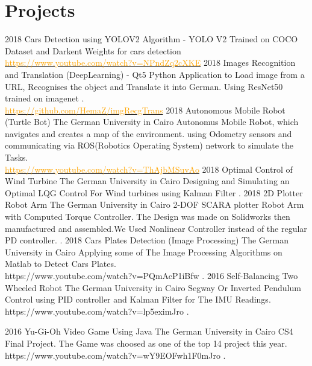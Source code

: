 \documentclass[]{friggeri-cv}
\begin{document}
\section{Projects}
\begin{entrylist}
 \entry
    {2018}
    {Cars Detection using YOLOV2 Algorithm}
    {-}
    {YOLO V2 Trained on COCO Dataset and Darkent Weights for cars detection\\
    {\href{https://www.youtube.com/watch?v=NPndZq2cXKE}{\textcolor{orange}{https://www.youtube.com/watch?v=NPndZq2cXKE}} }}
  \entry
    {2018}
    {Images Recognition and Translation (DeepLearning)}
    {-}
    {Qt5 Python Application to Load image from a URL, Recognises the object and Translate it into German.
    Using ResNet50 trained on imagenet . \\
    {\href{https://github.com/HemaZ/imgRecgTrans}{\textcolor{orange}{https://github.com/HemaZ/imgRecgTrans}} }}
  \entry
    {2018}
    {Autonomous Mobile Robot (Turtle Bot)}
    {The German University in Cairo}
    {Autonomus Mobile Robot, which navigates and creates a map of the environment. using Odometry sensors and communicating via ROS(Robotics Operating System) network to simulate the Tasks. \\
    {\href{https://www.youtube.com/watch?v=ThAjbMSuvAo}{\textcolor{orange}{https://www.youtube.com/watch?v=ThAjbMSuvAo}} }}
     \entry
    {2018}
    {Optimal Control of Wind Turbine}
    {The German University in Cairo}
    {Designing and Simulating an Optimal LQG Control For Wind turbines using Kalman Filter  .
    }
    \entry
    {2018}
    {2D Plotter Robot Arm}
    {The German University in Cairo}
    {2-DOF SCARA plotter Robot Arm with Computed Torque Controller. The Design was made on Solidworks then manufactured and assembled.We Used Nonlinear Controller instead of the regular PD controller.  .
    }
           \entry
    {2018}
    {Cars Plates Detection (Image Processing)}
    {The German University in Cairo}
    {Applying some of The Image Processing Algorithms on Matlab to Detect Cars Plates.\\
    https://www.youtube.com/watch?v=PQmAcP1iBfw  .
    }
           \entry
    {2016}
    {Self-Balancing Two Wheeled Robot}
    {The German University in Cairo}
    {Segway Or Inverted Pendulum Control using PID controller and Kalman Filter for The IMU Readings.\\
    https://www.youtube.com/watch?v=lp5exim\textunderscore Jro  .
    }
          
               \entry
    {2016}
    {Yu-Gi-Oh Video Game Using Java}
    {The German University in Cairo}
    {CS4 Final Project. The Game was choosed as one of the top 14 project this year.\\
    https://www.youtube.com/watch?v=wY9EOFwh1F0m\textunderscore Jro  .
    }    
                      
  \end{entrylist}   
\end{document}
